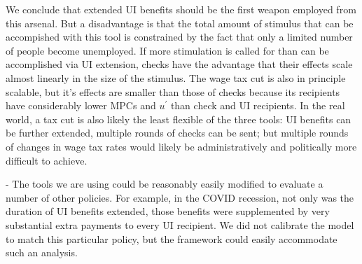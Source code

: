 \documentclass[../HAFiscal]{subfiles}
\begin{document}
We conclude that extended UI benefits should be the first weapon employed from this arsenal.  But a disadvantage is that the total amount of stimulus that can be accompished with this tool is constrained by the fact that only a limited number of people become unemployed.  If more stimulation is called for than can be accomplished via UI extension, checks have the advantage that their effects scale almost linearly in the size of the stimulus.  The wage tax cut is also in principle scalable, but it's effects are smaller than those of checks because its recipients have considerably lower MPCs and $u^{\prime}$ than check and UI recipients.  In the real world, a tax cut is also likely the least flexible of the three tools:  UI benefits can be further extended, multiple rounds of checks can be sent; but multiple rounds of changes in wage tax rates would likely be administratively and politically more difficult to achieve.

- The tools we are using could be reasonably easily modified to evaluate a number of other policies.  For example, in the COVID recession, not only was the duration of UI benefits extended, those benefits were supplemented by very substantial extra payments to every UI recipient.  We did not calibrate the model to match this particular policy, but the framework could easily accommodate such an analysis.
\end{document}
